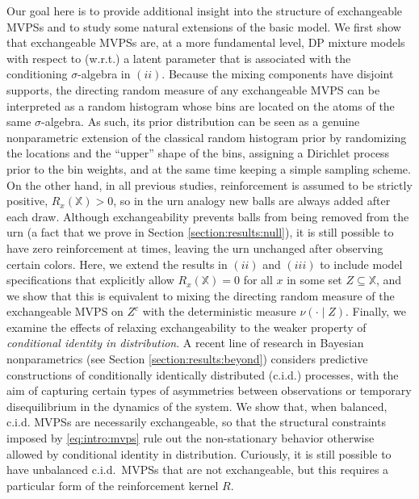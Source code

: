 \documentclass[a4paper]{article}
\theoremstyle{plain}
\theoremstyle{remark}
\theoremstyle{definition}
\begin{document}
Our goal here is to provide additional insight into the structure of exchangeable MVPSs and to study some natural extensions of the basic model. We first show that exchangeable MVPSs are, at a more fundamental level, DP mixture models with respect to (w.r.t.) a latent parameter that is associated with the conditioning $\sigma$-algebra in $(ii)$. Because the mixing components have disjoint supports, the directing random measure of any exchangeable MVPS can be interpreted as a random histogram whose bins are located on the atoms of the same $\sigma$-algebra. As such, its prior distribution can be seen as a genuine nonparametric extension of the classical random histogram prior \cite[][Example 5.11]{ghosal2017} by randomizing the locations and the ``upper'' shape of the bins, assigning a Dirichlet process prior to the bin weights, and at the same time keeping a simple sampling scheme. On the other hand, in all previous studies, reinforcement is assumed to be strictly positive, $R_x(\mathbb{X})>0$, so in the urn analogy new balls are always added after each draw. Although exchangeability prevents balls from being removed from the urn (a fact that we prove in Section \ref{section:results:null}), it is still possible to have zero reinforcement at times, leaving the urn unchanged after observing certain colors. Here, we extend the results in $(ii)$ and $(iii)$ to include model specifications that explicitly allow $R_x(\mathbb{X})=0$ for all $x$ in some set $Z\subseteq\mathbb{X}$, and we show that this is equivalent to mixing the directing random measure of the exchangeable MVPS on $Z^c$ with the deterministic measure $\nu(\cdot\mid Z)$. Finally, we examine the effects of relaxing exchangeability to the weaker property of \textit{conditional identity in distribution}. A recent line of research in Bayesian nonparametrics (see Section \ref{section:results:beyond}) considers predictive constructions of conditionally identically distributed (c.i.d.) processes, with the aim of capturing certain types of asymmetries between observations or temporary disequilibrium in the dynamics of the system. We show that, when balanced, c.i.d. MVPSs are necessarily exchangeable, so that the structural constraints imposed by \eqref{eq:intro:mvps} rule out the non-stationary behavior otherwise allowed by conditional identity in distribution. Curiously, it is still possible to have unbalanced c.i.d.~MVPSs that are not exchangeable, but this requires a particular form of the reinforcement kernel $R$.
\end{document}
